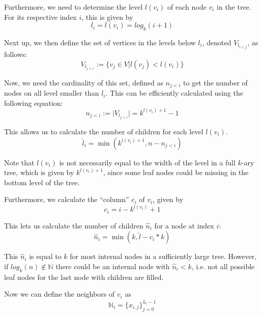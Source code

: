 Furthermore, we need to determine the level $l(v_i)$ of each node $v_i$ in the tree. For its respective index $i$, this is given by
\begin{equation}
    l_i = l(v_i) = log_k(i+1)
\end{equation}

Next up, we then define the set of vertices in the levels below $l_i$, denoted $V_{l_{i<j}}$, as follows:
\begin{equation}
    V_{l_{j<i}} := \{v_j \in V \vert l(v_j) < l(v_i) \}
\end{equation}

Now, we need the cardinality of this set, defined as $n_{j<i}$ to get the number of nodes on all level smaller than $l_i$. This can be efficiently calculated using the following equation:
\begin{equation}
     n_{j<i} := \vert V_{l_{j<i}}\vert = k^{l(v_i) + 1} - 1
\end{equation}

This allows us to calculate the number of children for each level $l(v_i)$.
\begin{equation}
    \hat{l}_i = \min(k^{l(v_i) + 1}, n - n_{j<i})
\end{equation}

\begin{note}
Note that $l(v_i)$ is not necessarily equal to the width of the level in a full $k$-ary tree, which is given by $k^{l(v_i) + 1}$, since some leaf nodes could be missing in the bottom level of the tree.
\end{note}

Furthermore, we calculate the ``column'' $c_i$ of $v_i$, given by
\begin{equation}
    c_i = i - k^{l(v_i)} + 1
\end{equation}

This lets us calculate the number of children $\hat{n}_i$ for a node at index $i$:
\begin{equation}
    \hat{n}_i = \min(k, \hat{l} - c_i * k)
\end{equation}

\begin{note}
    This $\hat{n}_i$ is equal to $k$ for most internal nodes in a sufficiently large tree. However, if $log_k(n) \notin \mathbb{N}$ there could be an internal node with $\hat{n}_i < k$, i.e. not all possible leaf nodes for the last node with children are filled.
\end{note}

Now we can define the neighbors of $v_i$ as
\begin{equation}
    \mathbb{N}_i = \{ x_{i, j} \}_{j=0}^{\hat{n}_i - 1} 
\end{equation}

